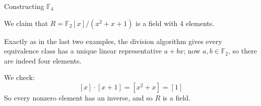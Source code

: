 \documentclass{beamer}
\begin{document}
\begin{frame}{Constructing $\mathbb{F}_4$}

We claim that $R=\mathbb{F}_2[x]/(x^2+x+1)$ is a field with 4 elements.  

Exactly as in the last two examples, the division algorithm gives every equivalence class has a unique linear representative $a+bx$; now $a,b\in\mathbb{F}_2$, so there are indeed four elements.

We check:
$$[x]\cdot [x+1]=[x^2+x]=[1]$$
So every nonzero element has an inverse, and so $R$ is a field.
\end{frame}
\end{document}
